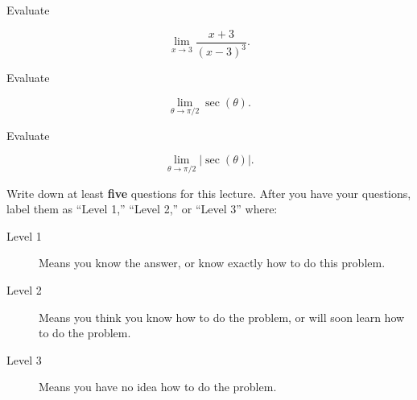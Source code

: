 \documentclass{ximera}
\begin{document}
\begin{question}
  Evaluate

  \[
  \lim_{x\to 3} \frac{x+3}{(x-3)^3}.
  \]
  
  \begin{multipleChoice}
  \end{multipleChoice}  
\end{question}



\begin{question}
  Evaluate

  \[
  \lim_{\theta\to \pi/2} \sec(\theta).
  \]
  
  \begin{multipleChoice}
  \end{multipleChoice}  
\end{question}


\begin{question}
  Evaluate

  \[
  \lim_{\theta\to \pi/2} |\sec(\theta)|.
  \]
  
  \begin{multipleChoice}
  \end{multipleChoice}  
\end{question}





\begin{question}
Write down at least \textbf{five} questions for this lecture. After
you have your questions, label them as ``Level 1,'' ``Level 2,'' or
``Level 3'' where:
\begin{description}
\item[Level 1] Means you know the answer, or know exactly how to do
  this problem.
\item[Level 2] Means you think you know how to do the problem, or will
  soon learn how to do the problem.
\item[Level 3] Means you have no idea how to do the problem.
\end{description}
  \begin{freeResponse}
  \end{freeResponse}
\end{question}
\end{document}
